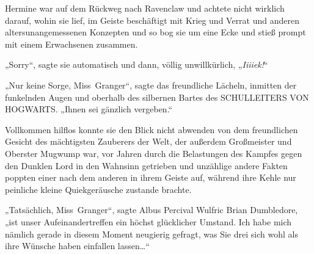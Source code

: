 \later

Hermine war auf dem Rückweg nach Ravenclaw und achtete nicht wirklich darauf, wohin sie lief, im Geiste beschäftigt mit Krieg und Verrat und anderen altersunangemessenen Konzepten und so bog sie um eine Ecke und stieß prompt mit einem Erwachsenen zusammen.

„Sorry“, sagte sie automatisch und dann, völlig unwillkürlich, „\emph{Iiiiek!}“

„Nur keine Sorge, Miss~Granger“, sagte das freundliche Lächeln, inmitten der funkelnden Augen und oberhalb des silbernen Bartes des SCHULLEITERS VON HOGWARTS. „Ihnen sei gänzlich vergeben.“

Vollkommen hilflos konnte sie den Blick nicht abwenden von dem freundlichen Gesicht des mächtigsten Zauberers der Welt, der außerdem Großmeister und Oberster Mugwump war, vor Jahren durch die Belastungen des Kampfes gegen den Dunklen Lord in den Wahnsinn getrieben und unzählige andere Fakten poppten einer nach dem anderen in ihrem Geiste auf, während ihre Kehle nur peinliche kleine Quiekgeräusche zustande brachte.

„Tatsächlich, Miss~Granger“, sagte Albus Percival Wulfric Brian Dumbledore, „ist unser Aufeinandertreffen ein höchst glücklicher Umstand. Ich habe mich nämlich gerade in diesem Moment neugierig gefragt, was Sie drei sich wohl als ihre Wünsche haben einfallen lassen…“

\later

